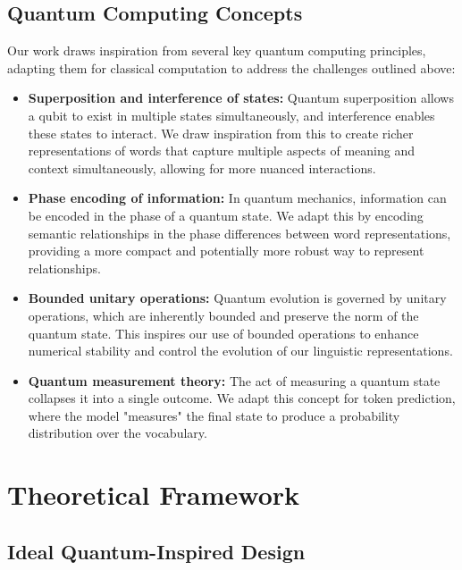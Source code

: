 \documentclass[twocolumn]{article}
\begin{document}
\subsection{Quantum Computing Concepts}
Our work draws inspiration from several key quantum computing principles, adapting them for classical computation to address the challenges outlined above:
\begin{itemize}
    \item \textbf{Superposition and interference of states:} Quantum superposition allows a qubit to exist in multiple states simultaneously, and interference enables these states to interact. We draw inspiration from this to create richer representations of words that capture multiple aspects of meaning and context simultaneously, allowing for more nuanced interactions.
    \item \textbf{Phase encoding of information:} In quantum mechanics, information can be encoded in the phase of a quantum state. We adapt this by encoding semantic relationships in the phase differences between word representations, providing a more compact and potentially more robust way to represent relationships.
    \item \textbf{Bounded unitary operations:} Quantum evolution is governed by unitary operations, which are inherently bounded and preserve the norm of the quantum state. This inspires our use of bounded operations to enhance numerical stability and control the evolution of our linguistic representations.
    \item \textbf{Quantum measurement theory:} The act of measuring a quantum state collapses it into a single outcome. We adapt this concept for token prediction, where the model "measures" the final state to produce a probability distribution over the vocabulary.
\end{itemize}

\section{Theoretical Framework}

\subsection{Ideal Quantum-Inspired Design}
\end{document}
